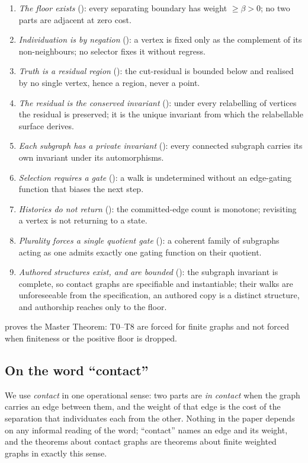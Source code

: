 \documentclass[11pt,a4paper]{article}
\theoremstyle{thmstyle}
\theoremstyle{definition}
\theoremstyle{remark}
\newcommand{\floorc}{\beta}               %
\begin{document}
\begin{enumerate}[label=\textbf{(T\arabic*)},leftmargin=3em,start=0]
\item \emph{The floor exists} (): every separating boundary has
weight $\ge\floorc>0$; no two parts are adjacent at zero cost.
\item \emph{Individuation is by negation} (): a vertex is
fixed only as the complement of its non-neighbours; no selector fixes it without
regress.
\item \emph{Truth is a residual region} (): the cut-residual
is bounded below and realised by no single vertex, hence a region, never a
point.
\item \emph{The residual is the conserved invariant} ():
under every relabelling of vertices the residual is preserved; it is the unique
invariant from which the relabellable surface derives.
\item \emph{Each subgraph has a private invariant} (): every
connected subgraph carries its own invariant under its automorphisms.
\item \emph{Selection requires a gate} (): a walk is
undetermined without an edge-gating function that biases the next step.
\item \emph{Histories do not return} (): the committed-edge
count is monotone; revisiting a vertex is not returning to a state.
\item \emph{Plurality forces a single quotient gate} (): a
coherent family of subgraphs acting as one admits exactly one gating function on
their quotient.
\item \emph{Authored structures exist, and are bounded} ():
the subgraph invariant is complete, so contact graphs are specifiable and
instantiable; their walks are unforeseeable from the specification, an authored
copy is a distinct structure, and authorship reaches only to the floor.
\end{enumerate}

 proves the Master Theorem: T0--T8 are forced for finite
graphs and not forced when finiteness or the positive floor is dropped.

\subsection{On the word ``contact''}

We use \emph{contact} in one operational sense: two parts are \emph{in contact}
when the graph carries an edge between them, and the weight of that edge is the
cost of the separation that individuates each from the other. Nothing in the
paper depends on any informal reading of the word; ``contact'' names an edge and
its weight, and the theorems about contact graphs are theorems about finite
weighted graphs in exactly this sense.
\end{document}
